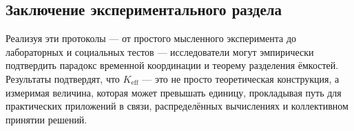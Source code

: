 \documentclass[12pt]{article}
\begin{document}
	\subsection{Заключение экспериментального раздела}
	
	Реализуя эти протоколы — от простого мысленного эксперимента до лабораторных и социальных тестов — исследователи могут эмпирически подтвердить парадокс временной координации и теорему разделения ёмкостей. Результаты подтвердят, что \(K_{\mathrm{eff}}\) — это не просто теоретическая конструкция, а измеримая величина, которая может превышать единицу, прокладывая путь для практических приложений в связи, распределённых вычислениях и коллективном принятии решений.
	
\end{document}
